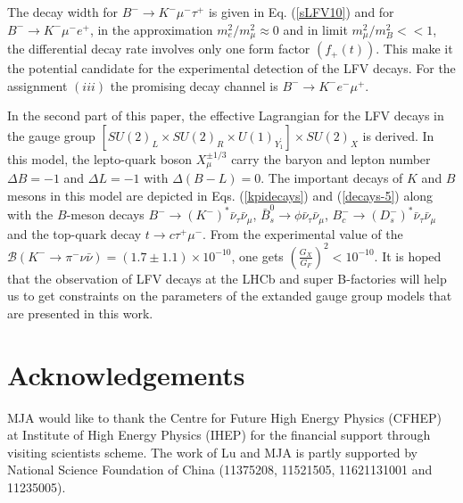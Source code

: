 \documentclass{ws-ijmpa}
\begin{document}
The decay width for $B^{-} \to K^{-}\mu^{-}\tau^{+}$ is given in Eq. (\ref{sLFV10}) and for $B^{-} \to K^{-}\mu^{-}e^{+}$, in the approximation $m^2_{e}/m_{\mu}^{2}\approx 0$ and in limit $m^2_{\mu}/m^{2}_{B}<< 1$, the differential decay rate involves only one form factor $(f_{+}(t))$. This make it the potential candidate for the experimental detection of the LFV decays. For the assignment $(iii)$ the promising decay channel is  $B^{-} \to K^{-}e^{-}\mu^{+}$.


In the second part of this paper, the effective Lagrangian for the LFV decays in the gauge group $\left[SU(2)_{L}\times SU(2)_{R}\times U(1)_{Y_1^{\prime}}\right] \times SU(2)_{X}$ is derived. In this model, the lepto-quark boson $X^{\pm 1/3}_{\mu}$ carry the baryon and lepton number $\Delta B  = -1$ and $\Delta L  = -1$ with $\Delta(B - L) = 0$. The important decays of $K$ and $B$ mesons in this model are depicted in Eqs. (\ref{kpidecays}) and (\ref{decays-5}) along with the $B$-meson decays $B^{-} \to (K^{-})^{*} \bar{\nu}_{\tau}\bar{\nu}_{\mu}$, $\bar{B}_{s}^{0} \to \phi \bar{\nu}_{\tau}\bar{\nu}_{\mu}$, $B^{-}_{c} \to (D^{-}_{s})^{*}\bar{\nu}_{\tau}\bar{\nu}_{\mu}$ and the top-quark decay $t \to c \tau^{+}\mu^{-}$.  From the experimental value of the $\mathcal{B}(K^{-} \to \pi^{-}\nu \bar{\nu}) = (1.7 \pm 1.1)\times 10^{-10}$, one gets $\left(\frac{G_{X}}{G_{F}}\right)^2 < 10^{-10}$. It is hoped that the observation of LFV decays at the LHCb and super B-factories will help us to get constraints on the parameters of the extanded gauge group models that are presented in this work.

\section*{Acknowledgements}
MJA would like to thank the Centre for Future High Energy Physics (CFHEP) at Institute of High Energy Physics (IHEP) for the financial support through visiting scientists scheme. The work of Lu and MJA is partly supported by National  Science Foundation of China (11375208, 11521505, 11621131001 and 11235005).
\end{document}
